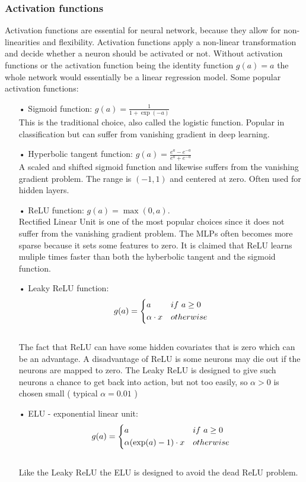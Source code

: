 \subsubsection{Activation functions}
Activation functions are essential for neural network, because they allow for non-linearities and flexibility. Activation functions apply a non-linear transformation and decide whether a neuron should be activated or not. Without activation functions or the activation function being the identity function $g(a)=a$ the whole network would essentially be a linear regression model. Some popular activation functions:
\begin{enumerate}
\item[•] Sigmoid function: $g(a)=\frac{1}{1+\exp(-a)}$\\

This is the traditional choice, also called the logistic function. Popular in classification but can suffer from vanishing gradient in deep learning.
\item[•] Hyperbolic tangent function: $g(a)=\frac{e^a-e^{-a}}{e^a+e^{-a}}$\\

A scaled and shifted sigmoid function and likewise suffers from the vanishing gradient problem. The range is $(-1,1)$ and centered at zero. Often used for hidden layers.
\item[•] ReLU function: $g(a)=\max(0,a)$.\\

Rectified Linear Unit is one of the most popular choices since it does not suffer from the vanishing gradient problem. The MLPs often becomes more sparse because it sets some features to zero. It is claimed that ReLU learns muliple times faster than both the hyberbolic tangent and the sigmoid function.
\item[•] Leaky ReLU function:  \[ g(a)=
    \begin{dcases}
        a & if \ a \geq 0 \\
        \alpha \cdot x & otherwise \\
    \end{dcases}
\]\\
The fact that ReLU can have some hidden covariates that is zero which can be an advantage. A disadvantage of ReLU is some neurons may die out if the neurons are mapped to zero. The Leaky ReLU is designed to give such neurons a chance to get back into action, but not too easily, so $\alpha>0$ is chosen small ( typical $\alpha=0.01$ ) 

\item[•] ELU - exponential linear unit:  \[ g(a)=
    \begin{dcases}
        a & if \ a \geq 0 \\
        \alpha(\exp(a)-1) \cdot x & otherwise \\
    \end{dcases}
\]\\
Like the Leaky ReLU the ELU is designed to avoid the dead ReLU problem. 
\end{enumerate}


